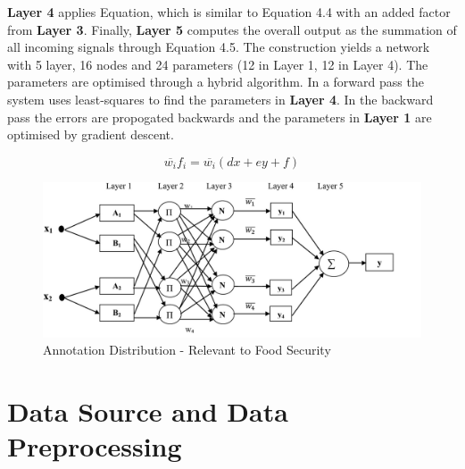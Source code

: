 \textbf{Layer 4} applies Equation, which is similar to Equation 4.4 with an added factor from \textbf{Layer 3}. Finally, \textbf{Layer 5 }computes the overall output as the summation of all incoming signals through Equation 4.5. The construction yields a network with 5 layer,  16 nodes and 24 parameters (12 in Layer 1, 12 in Layer 4). The parameters are optimised through a hybrid algorithm. In a forward pass the system uses least-squares to find the parameters in \textbf{Layer 4}. In the backward pass the errors are propogated backwards and the parameters in \textbf{Layer 1} are optimised by gradient descent.  
 
 \begin{equation} \label{eq:gaus}
 \overline{w_i} f_i =  \overline{w_i }(dx + ey + f) \end{equation}



\begin{figure}[H]
        \centering
         \includegraphics[width=1\textwidth ]{img/model/gnn_fuzz}      
        \caption{Annotation Distribution - Relevant to Food Security}
        \label{fig:gnn_fuzz}
\end{figure}





\section{Data Source and Data Preprocessing}

